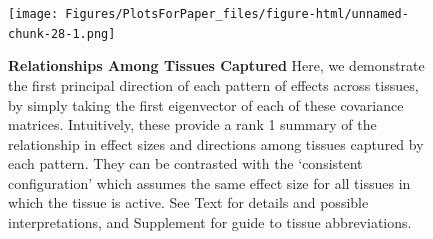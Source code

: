 \begin{figure}[htbp]
\texttt{[image: Figures/PlotsForPaper\_files/figure-html/unnamed-chunk-28-1.png]}
\caption{\textbf{Relationships Among Tissues Captured} Here, we demonstrate the first principal direction of each pattern of effects across tissues, by simply taking the first eigenvector of each of these covariance matrices. Intuitively, these provide a rank 1 summary of the relationship in effect sizes and directions among tissues captured by each pattern. They can be contrasted with the `consistent configuration' which assumes the same effect size for all tissues in which the tissue is active. See Text for details and possible interpretations, and Supplement for guide to tissue abbreviations.}
\label{fig:pcplot}
\end{figure}\newline

%

